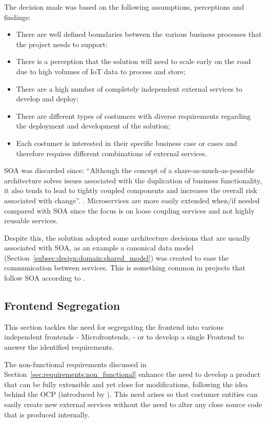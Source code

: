 The decision made was based on the following assumptions, perceptions and findings:

\begin{itemize}
   \item There are well defined boundaries between the various business processes that the project needs to support;
   \item There is a perception that the solution will need to scale early on the road due to high volumes of \gls{IoT} data to process and store;
   \item There are a high number of completely independent external services to develop and deploy;
   \item There are different types of costumers with diverse requirements regarding the deployment and development of the solution;
   \item Each costumer is interested in their specific business case or cases and therefore requires different combinations of external services.
\end{itemize}

\gls{SOA} was discarded since: ``Although the concept of a share-as-much-as-possible architecture solves issues associated with the duplication of business functionality, it also tends to lead to tightly coupled components and increases the overall risk associated with change''. \parencite{richards2015microservices}. Microservices are more easily extended when/if needed compared with \gls{SOA} since the focus is on loose coupling services and not highly reusable services.

Despite this, the solution adopted some architecture decisions that are usually associated with \gls{SOA}, as an example a canonical data model (Section~\ref{subsec:design:domain:shared_model}) was created to ease the communication between services. This is something common in projects that follow \gls{SOA} according to \cite{cerny2017disambiguation}.

\subsection{Frontend Segregation}
\label{subsec:design:alternatives:frontend}

This section tackles the need for segregating the frontend into various independent frontends - Microfrontends, \cite{microfrontends} - or to develop a single Frontend to answer the identified requirements.

The non-functional requirements discussed in Section~\ref{sec:requirements:non_functional} enhance the need to develop a product that can be fully extensible and yet close for modifications, following the idea behind the \gls{OCP} (introduced by \cite{martin2003agile}). This need arises so that costumer entities can easily create new external services without the need to alter any close source code that is produced internally.

